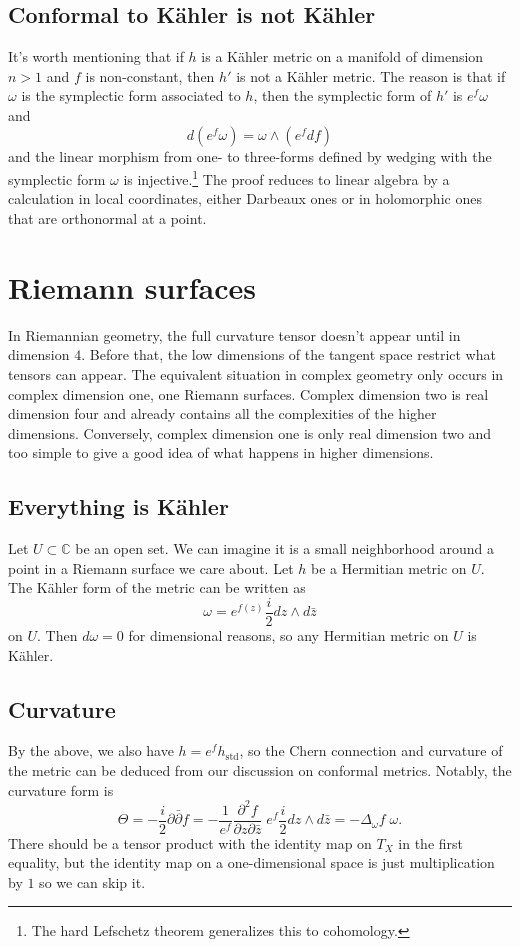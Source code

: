 \documentclass[11pt]{article}
\newcommand{\kk}[1]{\mathbb{#1}}
\begin{document}
\subsection{Conformal to K\"ahler is not K\"ahler}
\label{sec:org7b1cfdf}

It's worth mentioning that if \(h\) is a K\"ahler metric on a manifold of dimension \(n > 1\) and \(f\) is non-constant, then \(h'\) is not a K\"ahler metric. The reason is that if \(\omega\) is the symplectic form associated to \(h\), then the symplectic form of \(h'\) is \(e^f \omega\) and
$$
d(e^f \omega) = \omega \wedge (e^f df)
$$
and the linear morphism from one- to three-forms defined by wedging with the symplectic form \(\omega\) is injective.\footnote{The hard Lefschetz theorem generalizes this to cohomology.}
The proof reduces to linear algebra by a calculation in local coordinates, either Darbeaux ones or in holomorphic ones that are orthonormal at a point.


\section{Riemann surfaces}
\label{sec:org776713b}

In Riemannian geometry, the full curvature tensor doesn't appear until in dimension $4$. Before that, the low dimensions of the tangent space restrict what tensors can appear. The equivalent situation in complex geometry only occurs in complex dimension one, one Riemann surfaces. Complex dimension two is real dimension four and already contains all the complexities of the higher dimensions. Conversely, complex dimension one is only real dimension two and too simple to give a good idea of what happens in higher dimensions.

\subsection{Everything is K\"ahler}
Let $U \subset \kk C$ be an open set. We can imagine it is a small neighborhood around a point in a Riemann surface we care about. Let $h$ be a Hermitian metric on $U$. The K\"ahler form of the metric can be written as
$$
\omega = e^{f(z)} \frac{i}{2} dz \wedge d\bar z
$$
on $U$. Then $d\omega = 0$ for dimensional reasons, so any Hermitian metric on $U$ is K\"ahler.

\subsection{Curvature}
By the above, we also have $h = e^f h_{\mathrm{std}}$, so the Chern connection and curvature of the metric can be deduced from our discussion on conformal metrics. Notably, the curvature form is
$$
\Theta
= -\frac i2\partial\bar\partial f
= -\frac{1}{e^f}\frac{\partial^2f}{\partial z \partial \bar z} \; e^f \frac{i}{2} dz \wedge d\bar z
= -\Delta_\omega f \; \omega.
$$
There should be a tensor product with the identity map on $T_X$ in the first equality, but the identity map on a one-dimensional space is just multiplication by $1$ so we can skip it.
\end{document}
